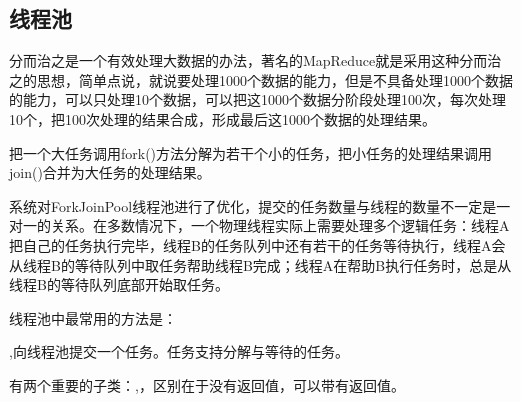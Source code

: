 \documentclass[a4paper]{report}
\begin{document}
\subsection{线程池}
分而治之是一个有效处理大数据的办法，著名的MapReduce就是采用这种分而治之的思想，简单点说，就说要处理1000个数据的能力，但是不具备处理1000个数据的能力，可以只处理10个数据，可以把这1000个数据分阶段处理100次，每次处理10个，把100次处理的结果合成，形成最后这1000个数据的处理结果。

把一个大任务调用fork()方法分解为若干个小的任务，把小任务的处理结果调用join()合并为大任务的处理结果。

系统对ForkJoinPool线程池进行了优化，提交的任务数量与线程的数量不一定是一对一的关系。在多数情况下，一个物理线程实际上需要处理多个逻辑任务：线程A把自己的任务执行完毕，线程B的任务队列中还有若干的任务等待执行，线程A会从线程B的等待队列中取任务帮助线程B完成；线程A在帮助B执行任务时，总是从线程B的等待队列底部开始取任务。

线程池中最常用的方法是：

,向线程池提交一个任务。任务支持分解与等待的任务。

有两个重要的子类：,，区别在于没有返回值，可以带有返回值。
\end{document}

